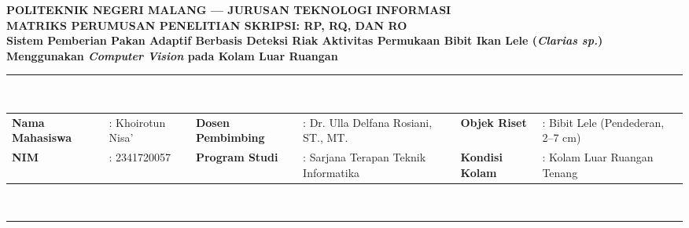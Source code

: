 \documentclass[10pt,a4paper]{article}
\begin{document}

\begin{center}
    {\large \textbf{\color{navy}POLITEKNIK NEGERI MALANG --- JURUSAN TEKNOLOGI INFORMASI}}\\[2pt]
    {\Large \textbf{\color{navy}MATRIKS PERUMUSAN PENELITIAN SKRIPSI: RP, RQ, DAN RO}}\\[2pt]
    {\normalsize \textbf{Sistem Pemberian Pakan Adaptif Berbasis Deteksi Riak Aktivitas Permukaan Bibit Ikan Lele (\textit{Clarias sp.}) Menggunakan \textit{Computer Vision} pada Kolam Luar Ruangan}}\\[4pt]
    \rule{\textwidth}{1.2pt}\\[3pt]
    
    \footnotesize
    \begin{tabular}{p{3.2cm} p{5.6cm} p{3.2cm} p{5.6cm} p{3.0cm} p{4.5cm}}
        \textbf{Nama Mahasiswa} & : Khoirotun Nisa' & \textbf{Dosen Pembimbing} & : Dr. Ulla Delfana Rosiani, ST., MT. & \textbf{Objek Riset} & : Bibit Lele (Pendederan, 2--7 cm) \\
        \textbf{NIM} & : 2341720057 & \textbf{Program Studi} & : Sarjana Terapan Teknik Informatika & \textbf{Kondisi Kolam} & : Kolam Luar Ruangan Tenang \\
    \end{tabular}\\[1pt]
    \rule{\textwidth}{0.6pt}
\end{center}

\vspace{-0.2cm}
\end{document}
